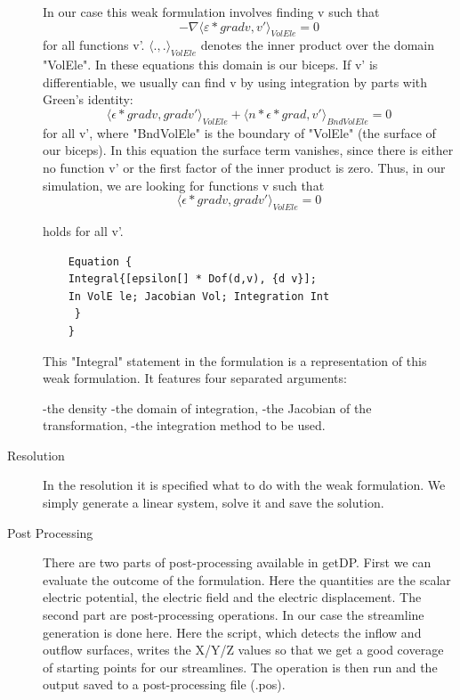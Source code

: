 \documentclass[preprint,journal]{vgtc}       %
\begin{document}
\begin{description}
	In our case this weak formulation involves finding v such that
	\[-\nabla \langle \varepsilon *\mathrel{grad} v, v' \rangle _{VolEle}= 0\]
	for all functions v'. $\langle .,. \rangle _{VolEle}$ denotes the inner product over the domain "VolEle". 
	In these equations this domain is our biceps. 
	If v' is differentiable, we usually can find v by using integration by parts with Green's identity:
	\[\langle \epsilon * \mathrel{grad} v, \mathrel{grad} v' \rangle _{VolEle} + \langle n * \epsilon * \mathrel{grad} , v' \rangle _{BndVolEle} =  0\]
	for all v', where "BndVolEle" is the boundary of "VolEle" (the surface of our biceps). 
	In this equation the surface term vanishes, since there is either no function v' or the first factor of the inner product is zero.
	Thus, in our simulation, we are looking for functions v such that 
	\[
	\langle {\epsilon * \mathrel{grad} {v}, \mathrel{grad} v'} \rangle _{VolEle} =  0
	\]
	
	holds for all v'.
	\begin{verbatim} 
	Equation {
	Integral{[epsilon[] * Dof(d,v), {d v}]; 
	In VolE le; Jacobian Vol; Integration Int
	 }
	}
	\end{verbatim}
	
	This "Integral" statement in the formulation is a representation of this weak formulation. 
	It features four separated arguments:
	
	-the density\newline
	-the domain of integration, \newline
	-the Jacobian of the transformation, \newline
	-the integration method to be used.
	
	\item[Resolution]
	In the resolution it is specified what to do with the weak formulation. 
	We simply generate a linear system, solve it and save the solution.  
	\item[Post Processing]
	There are two parts of post-processing available in getDP. 
	First we can evaluate the outcome of the formulation. 
	Here the quantities are the scalar electric potential, the electric field and the electric displacement.
	The second part are post-processing operations. 
	In our case the streamline generation is done here. 
	Here the script, which detects the inflow and outflow surfaces, writes the X/Y/Z values so that we get a good coverage of starting points for our streamlines. 
	The operation is then run and the output saved to a post-processing file (.pos).
	\end{description}
\end{document}
